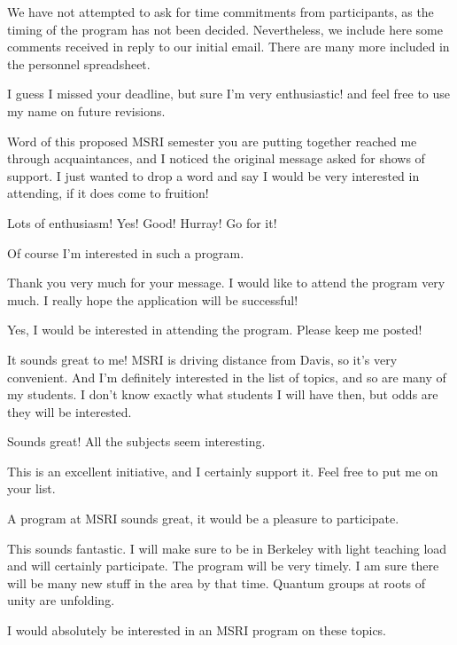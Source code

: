 \documentclass[12pt]{article}
\begin{document}
We have not attempted to ask for time commitments from participants, as the timing of the program has not been decided. Nevertheless, we include here some comments received in reply to our initial email. There are many more included in the personnel spreadsheet.
\begin{description}
  \setlength{\itemsep}{1pt}
  \setlength{\parskip}{0pt}
  \setlength{\parsep}{0pt}
\item[David Ben-Zvi] I guess I missed your deadline, but sure I'm very enthusiastic! and feel free to use my name on future revisions.
\item[Alexandru Chirvasitua] Word of this proposed MSRI semester you are putting together reached me through acquaintances, and I noticed the original message asked for shows of support. I just wanted to drop a word and say I would be very interested in attending, if it does come to fruition!
\item[Andre Henriques] Lots of enthusiasm! Yes! Good! Hurray! Go for it!
\item[Masaki Izumi] Of course I'm interested in such a program.
\item[Yasuyuki Kawahigashi] Thank you very much for your message. I would like to attend the program very much. I really hope the application will be successful!
\item[Alexander Kirillov] Yes, I would be interested in attending the program. Please keep me posted!
\item[Greg Kuperberg] It sounds great to me!   MSRI is driving distance from Davis, so it's very convenient.  And I'm definitely interested in the list of topics, and so are many of my students.   I don't know exactly what students I will have then, but odds are they will be interested.
\item[Zhengwei Liu] Sounds great! All the subjects seem interesting.
\item[Michael M\"uger] This is an excellent initiative, and I certainly support it. Feel free to put me on your list. 
\item[Sonia Natale] A program at MSRI sounds great, it would be a pleasure to participate.
\item[Nicolai Reshetikhin] This sounds fantastic. I will make sure to be in Berkeley with light teaching load and will certainly participate. The program will be very timely. I am sure there will be many new stuff in the area by that time. Quantum groups at roots of unity are unfolding.
\item[Claudia Scheimbauer] I would absolutely be interested in an MSRI program on these topics.

\end{description}
\end{document}
